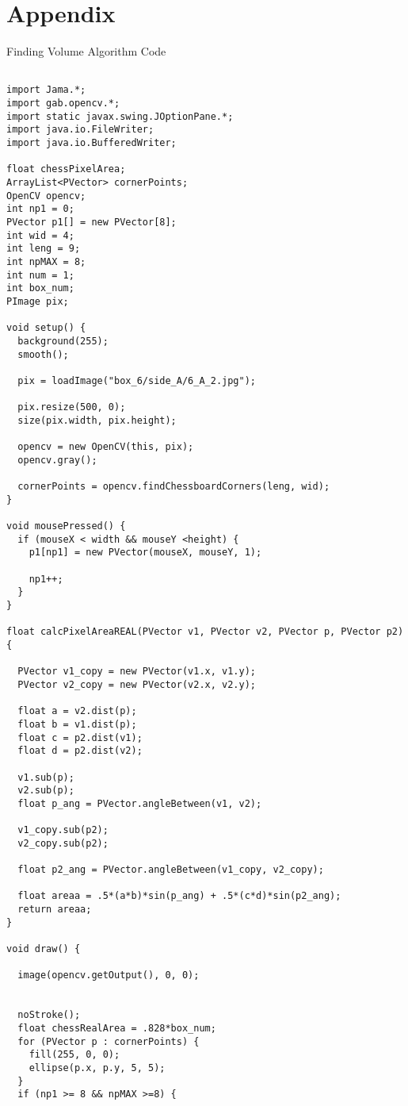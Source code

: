 \documentclass[11pt, twoside, reqno]{book}
\begin{document}
\chapter{Appendix}
\label{label}
\begin{centering}
	Finding Volume Algorithm Code
\end{centering}


\begin{Verbatim}

import Jama.*;
import gab.opencv.*;
import static javax.swing.JOptionPane.*;
import java.io.FileWriter;
import java.io.BufferedWriter;

float chessPixelArea;
ArrayList<PVector> cornerPoints;
OpenCV opencv;
int np1 = 0; 
PVector p1[] = new PVector[8];
int wid = 4;
int leng = 9;
int npMAX = 8; 
int num = 1;
int box_num;
PImage pix;

void setup() {
  background(255);
  smooth();

  pix = loadImage("box_6/side_A/6_A_2.jpg");

  pix.resize(500, 0);
  size(pix.width, pix.height);

  opencv = new OpenCV(this, pix);
  opencv.gray();

  cornerPoints = opencv.findChessboardCorners(leng, wid);
}

void mousePressed() {
  if (mouseX < width && mouseY <height) {
    p1[np1] = new PVector(mouseX, mouseY, 1);

    np1++;
  }
}

float calcPixelAreaREAL(PVector v1, PVector v2, PVector p, PVector p2) {

  PVector v1_copy = new PVector(v1.x, v1.y);
  PVector v2_copy = new PVector(v2.x, v2.y); 

  float a = v2.dist(p); 
  float b = v1.dist(p); 
  float c = p2.dist(v1); 
  float d = p2.dist(v2); 

  v1.sub(p);
  v2.sub(p);
  float p_ang = PVector.angleBetween(v1, v2);

  v1_copy.sub(p2); 
  v2_copy.sub(p2);

  float p2_ang = PVector.angleBetween(v1_copy, v2_copy);

  float areaa = .5*(a*b)*sin(p_ang) + .5*(c*d)*sin(p2_ang);
  return areaa;
}

void draw() { 

  image(opencv.getOutput(), 0, 0);


  noStroke();
  float chessRealArea = .828*box_num;
  for (PVector p : cornerPoints) {
    fill(255, 0, 0);
    ellipse(p.x, p.y, 5, 5);
  }
  if (np1 >= 8 && npMAX >=8) { 


\end{Verbatim}
\end{document}
